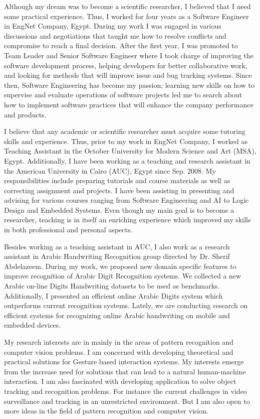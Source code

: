 \documentclass[10pt]{article}%
\begin{document}
 	Although my dream was to become a scientific researcher, I believed that I need some practical experience. Thus, I worked for four years as a Software Engineer in EngNet Company, Egypt. During my work I was engaged in various discussions and negotiations that taught me how to resolve conflicts and compromise to reach a final decision. After the first year, I was promoted to Team Leader and Senior Software Engineer where I took charge of improving the software development process, helping developers for better collaborative work, and looking for methods that will improve issue and bug tracking systems. Since then, Software Engineering has become my passion; learning new skills on how to supervise and evaluate operations of software projects led me to search about how to implement software practices that will enhance the company performance and products.

I believe that any academic or scientific researcher must acquire some tutoring skills and experience. Thus, prior to my work in EngNet Company, I worked as Teaching Assistant in the October University for Modern Science and Art (MSA), Egypt. Additionally, I have been working as a teaching and research assistant in the American University in Cairo (AUC), Egypt since Sep. 2008. My responsibilities include preparing tutorials and course materials as well as correcting assignment and projects. I have been assisting in presenting and advising for various courses ranging from Software Engineering and AI to Logic Design and Embedded Systems. Even though my main goal is to become a researcher, teaching is in itself an enriching experience which improved my skills in both professional and personal aspects.

 
 	Besides working as a teaching assistant in AUC, I also work as a research assistant in Arabic Handwriting Recognition group directed by Dr. Sherif Abdelazeem. During my work, we proposed new domain specific features to improve recognition of Arabic Digit Recognition systems. We collected a new Arabic on-line Digits Handwriting datasets to be used as benchmarks. Additionally, I presented an efficient online Arabic Digits system which outperforms current recognition systems.  Lately, we are conducting research on efficient systems for recognizing online Arabic handwriting on mobile and embedded devices. 

My research interests are in mainly in the areas of pattern recognition and computer vision problems. I am concerned with developing theoretical and practical solutions for Gesture based interaction systems.  My interests emerge from the increase need for solutions that can lead to a natural human-machine interaction. I am also fascinated with developing application to solve object tracking and recognition problems. For instance the current challenges in video surveillance and tracking in an unrestricted environment. But I am also open to more ideas in the field of pattern recognition and computer vision. 
\end{document}

